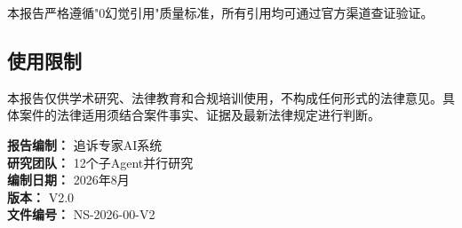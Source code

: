 \documentclass[12pt,a4paper]{article}
\begin{document}
本报告严格遵循"0幻觉引用"质量标准，所有引用均可通过官方渠道查证验证。

\subsection{使用限制}
本报告仅供学术研究、法律教育和合规培训使用，不构成任何形式的法律意见。具体案件的法律适用须结合案件事实、证据及最新法律规定进行判断。

\vfill

\begin{center}
\small\color{PrimaryColor}
\textbf{报告编制：} 追诉专家AI系统 \\
\textbf{研究团队：} 12个子Agent并行研究 \\
\textbf{编制日期：} 2026年8月 \\
\textbf{版本：} V2.0 \\
\textbf{文件编号：} NS-2026-00-V2
\end{center}
\end{document}
